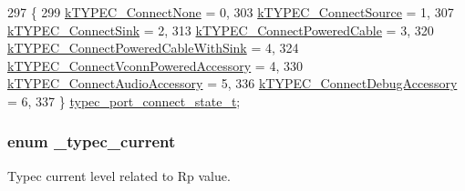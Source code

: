 \begin{DoxyCode}
297 \{
299     \hyperlink{group__usb__pd__stack_gga5dcf4d70a373001cfde169f0e8b9a1baa1b6d208fb63489f6e80b3dc799aa9c86}{kTYPEC\_ConnectNone} = 0,
303     \hyperlink{group__usb__pd__stack_gga5dcf4d70a373001cfde169f0e8b9a1baa18eca9dd0eea417e318901214fabeab2}{kTYPEC\_ConnectSource} = 1,
307     \hyperlink{group__usb__pd__stack_gga5dcf4d70a373001cfde169f0e8b9a1baae6a08556f4bb1b80036fb9337d17174c}{kTYPEC\_ConnectSink} = 2,
313     \hyperlink{group__usb__pd__stack_gga5dcf4d70a373001cfde169f0e8b9a1baa176b6047417cd678a54c51197e178247}{kTYPEC\_ConnectPoweredCable} = 3,
320     \hyperlink{group__usb__pd__stack_gga5dcf4d70a373001cfde169f0e8b9a1baa778111413f201ebe3e54208b7ada83da}{kTYPEC\_ConnectPoweredCableWithSink} = 4,
324     \hyperlink{group__usb__pd__stack_gga5dcf4d70a373001cfde169f0e8b9a1baabe52f1d315591ba1128796fe989888b6}{kTYPEC\_ConnectVconnPoweredAccessory} = 4,
330     \hyperlink{group__usb__pd__stack_gga5dcf4d70a373001cfde169f0e8b9a1baaec27082d89b892747d115c26290da78f}{kTYPEC\_ConnectAudioAccessory} = 5,
336     \hyperlink{group__usb__pd__stack_gga5dcf4d70a373001cfde169f0e8b9a1baa2bfe3fb0aa9780231c7c87e8803bd591}{kTYPEC\_ConnectDebugAccessory} = 6,
337 \} \hyperlink{group__usb__pd__stack_ga416d720fe603166cb1c16443199d42f8}{typec\_port\_connect\_state\_t};
\end{DoxyCode}
\hypertarget{group__usb__pd__stack_gaf956bb4d3d27df52fb694311b8219b0e}{
\subsubsection[{\-\_\-typec\-\_\-current}]{\setlength{\rightskip}{0pt plus 5cm}enum {\bf \-\_\-typec\-\_\-current}}}\label{group__usb__pd__stack_gaf956bb4d3d27df52fb694311b8219b0e}


Typec current level related to Rp value. 

